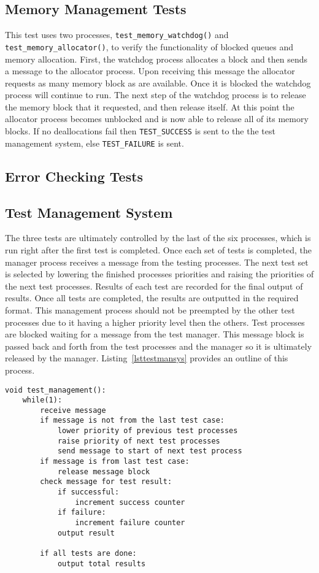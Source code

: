 \documentclass[oneside]{article}
\begin{document}
\subsection*{Memory Management Tests}
This test uses two processes, \texttt{test\_memory\_watchdog()} and 
\texttt{test\_memory\_allocator()}, to verify the functionality of blocked 
queues and memory allocation. First, the watchdog process allocates a block and 
then sends a message to the allocator process. Upon receiving this message the 
allocator requests as many memory block as are available. Once it is blocked the 
watchdog process will continue to run. The next step of the watchdog process is 
to release the memory block that it requested, and then release itself. At this 
point the allocator process becomes unblocked and is now able to release all of 
its memory blocks. If no deallocations fail then \texttt{TEST\_SUCCESS} is sent 
to the the test management system, else \texttt{TEST\_FAILURE} is sent.

\subsection*{Error Checking Tests}

\subsection*{Test Management System}
The three tests are ultimately controlled by the last of the six processes,
which is run right after the first test is completed. Once each set of tests is
completed, the manager process receives a message from the testing processes.
The next test set is selected by lowering the finished processes priorities and
raising the priorities of the next test processes. Results of each test are
recorded for the final output of results. Once all tests are completed, the
results are outputted in the required format. This management process should
not be preempted by the other test processes due to it having a higher priority
level then the others. Test processes are blocked waiting for a message from
the test manager. This message block is passed back and forth from the test
processes and the manager so it is ultimately released by the manager.
Listing~\ref{lsttestmansys} provides an outline of this process.

\begin{lstlisting}
void test_management():
    while(1):
        receive message
        if message is not from the last test case:
            lower priority of previous test processes
            raise priority of next test processes
            send message to start of next test process
        if message is from last test case:
            release message block
        check message for test result:
            if successful:
                increment success counter
            if failure:
                increment failure counter
            output result
        
        if all tests are done:
            output total results
\end{lstlisting}
\end{document}
